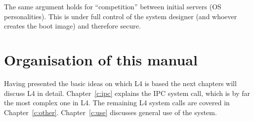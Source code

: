 The same argument holds for ``competition'' between initial servers (OS
personalities). This is under full control of the system designer (and
whoever creates the boot image) and therefore secure.


\section{Organisation of this manual}

Having presented the basic ideas on which L4 is based the next chapters
will discuss L4 in detail. Chapter~\ref{c:ipc} explains the IPC system
call, which is by far the most complex one in L4. The remaining L4
system calls are covered in Chapter~\ref{c:other}. Chapter~\ref{c:use}
discusses general use of the system.

% 
